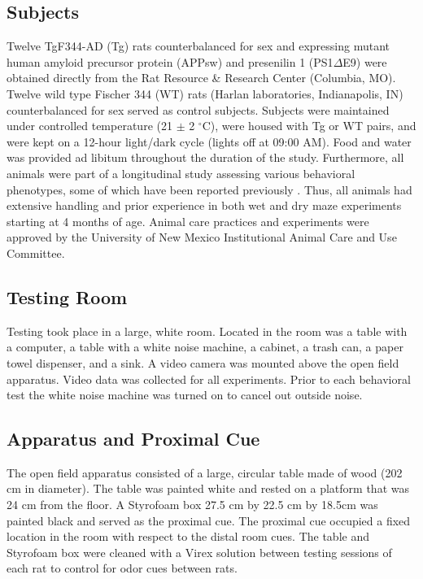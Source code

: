 \documentclass[fleqn,10pt]{wlscirep}
\begin{document}
\subsection*{Subjects} 
Twelve TgF344-AD (Tg) rats counterbalanced for sex and expressing mutant human amyloid precursor protein (APPsw) and presenilin 1 (PS1$\Delta$E9) were obtained directly from the Rat Resource \& Research Center (Columbia, MO). Twelve wild type Fischer 344 (WT) rats (Harlan laboratories, Indianapolis, IN) counterbalanced for sex served as control subjects. Subjects were maintained under controlled temperature (21 $\pm$ 2 $^{\circ}$C), were housed with Tg or WT pairs, and were kept on a 12-hour light/dark cycle (lights off at 09:00 AM). Food and water was provided ad libitum throughout the duration of the study. Furthermore, all animals were part of a longitudinal study assessing various behavioral phenotypes, some of which have been reported previously \cite{berkowitz_progressive_2018,pentkowski_anxiety-like_2018}. Thus, all animals had extensive handling and prior experience in both wet and dry maze experiments starting at 4 months of age. Animal care practices and experiments were approved by the University of New Mexico Institutional Animal Care and Use Committee.

\subsection*{Testing Room}
Testing took place in a large, white room. Located in the room was a table with a computer, a table with a white noise machine, a cabinet, a trash can, a paper towel dispenser, and a sink. A video camera was mounted above the open field apparatus. Video data was collected for all experiments. Prior to each behavioral test the white noise machine was turned on to cancel out outside noise.

\subsection*{Apparatus and Proximal Cue}
The open field apparatus consisted of a large, circular table made of wood (202 cm in diameter). The table was painted white and rested on a platform that was 24 cm from the floor. A Styrofoam box 27.5 cm by 22.5 cm by 18.5cm was painted black and served as the proximal cue. The proximal cue occupied a fixed location in the room with respect to the distal room cues. The table and Styrofoam box were cleaned with a Virex solution between testing sessions of each rat to control for odor cues between rats.
\end{document}
